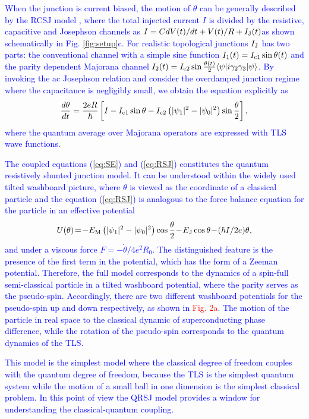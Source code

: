 \documentclass[aps,prl,twocolumn,showpacs,showpacs,10pt,superscriptaddress]{revtex4-1}
\newcommand{\red}[1]{\textcolor{red}{#1}}
\newcommand{\blue}[1]{\textcolor{blue}{#1}}
\begin{document}
\blue{When the junction is current biased, the motion of $\theta$ can be generally described by the RCSJ model \cite{tinkhambook}, where the total injected current $I$ is divided by the resistive, capacitive and Josephson channels as $I= C {dV(t)}/{dt} +{V(t)}/{ R } + I_{\rm J}(t)$as shown schematically in Fig. \ref{fig:setup}c. For realistic topological junctions $I_{\rm J}$ has two parts\cite{supplement}: the conventional channel with a simple sine function $I_1(t) = I_{\rm c1}\sin{\theta(t)}$ and the parity dependent Majorana channel $I_2(t)  =  I_{\rm c2}\sin{\frac{\theta(t)}{2}}\langle \psi| i\gamma_2\gamma_3 |\psi\rangle$. By invoking the ac Josephson relation and consider the overdamped junction regime where the capacitance is negligibly small, we obtain the equation explicitly as
\begin{equation}\label{eq:RSJ}
\frac{d\theta}{dt} = \frac{2eR}{\hbar} \left[I - I_{\rm c1}\sin{\theta} - I_{\rm c2}\left(|\psi_1|^2 - |\psi_0|^2\right)  \sin{\frac{\theta}{2}}\right],
\end{equation}
where the quantum average over Majorana operators are expressed with TLS wave functions.}

\blue{The coupled equations (\ref{eq:SE}) and (\ref{eq:RSJ}) constitutes the quantum resistively shunted junction model. It can be understood within the widely used tilted washboard picture\cite{tinkhambook}, where $\theta$ is viewed as the coordinate of a classical particle and the equation (\ref{eq:RSJ}) is analogous to the force balance equation for the particle in an effective potential
\begin{equation}
U(\theta)\!=\!-E_{\rm M} \left(|\psi_1|^2 - |\psi_0|^2\right)  \cos{\frac{\theta}{2}}\!-\!E_{\rm J}\cos{\theta}\!-\!(\hbar I/2e)\theta,
\end{equation}
and under a viscous force $F = - \dot \theta/ {4e^2 R_0}$. The distinguished feature is the presence of the first term in the potential, which has the form of a Zeeman potential. Therefore, the full model corresponds to the dynamics of a spin-full \blue{semi-classical} particle in a tilted washboard potential, where the parity serves as the pseudo-spin. Accordingly, there are two different washboard potentials for the pseudo-spin up and down respectively, as shown in \red{Fig. 2a}. The motion of the particle in real space to the classical dynamic of superconducting phase difference, while the rotation of the pseudo-spin corresponds to the quantum dynamics of the TLS.}


\blue{This model is the simplest model where the classical degree of freedom couples with the quantum degree of freedom, because the TLS is the simplest quantum system while the motion of a small ball in one dimension is the simplest classical problem. In this point of view the QRSJ model provides a window for understanding the classical-quantum coupling.}
\end{document}
